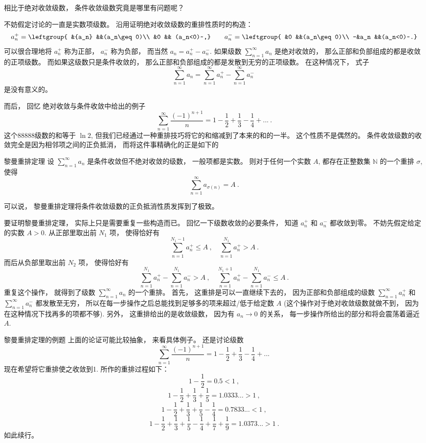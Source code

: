 

相比于绝对收敛级数， 条件收敛级数究竟是哪里有问题呢？ 

不妨假定讨论的一直是实数项级数。 沿用证明绝对收敛级数的重排性质时的构造： 
$$
a_n^+=\leftgroup{
&{a_n} &&(a_n\geq0)\\
&0 && (a_n<0)~,}
\qquad
a_n^-=\leftgroup{
&0 &&(a_n\geq0)\\
-&a_n &&(a_n<0)~.}
$$
可以很合理地将 $a_n^+$ 称为正部， $a_n^-$ 称为负部， 而当然 $a_n=a_n^+-a_n^-$. 如果级数 $\sum_{n=1}^\infty a_n$ 是绝对收敛的， 那么正部和负部组成的都是收敛的正项级数。 而如果这级数只是条件收敛的， 那么正部和负部组成的都是发散到无穷的正项级数。 在这种情况下， 式子
$$
\sum_{n=1}^\infty a_n=\sum_{n=1}^\infty a_n^+-\sum_{n=1}^\infty a_n^-~
$$
是没有意义的。

而后， 回忆 绝对收敛与条件收敛中给出的例子
$$
\sum_{n=1}^\infty\frac{(-1)^{n+1}}{n}
=1-\frac{1}{2}+\frac{1}{3}-\frac{1}{4}+...~.
$$
这个88888级数的和等于 $\ln2$, 但我们已经通过一种重排技巧将它的和缩减到了本来的和的一半。 这个性质不是偶然的。 条件收敛级数的收敛完全是因为相邻项之间的正负抵消， 而将这件事精确化的正是如下的

\begin{theorem}{黎曼重排定理}
设 $\sum_{n=1}^\infty a_n$ 是条件收敛但不绝对收敛的级数， 一般项都是实数。 则对于任何一个实数 $A$, 都存在正整数集 $\mathbb{N}$ 的一个重排 $\sigma$, 使得
$$
\sum_{n=1}^\infty a_{\sigma(n)}=A~.
$$
\end{theorem}

可以说， 黎曼重排定理将条件收敛级数的正负抵消性质发挥到了极致。

要证明黎曼重排定理， 实际上只是需要重复一些构造而已。 回忆一下级数收敛的必要条件， 知道 $a_n^+$ 和 $a_n^-$ 都收敛到零。 不妨先假定给定的实数 $A>0$. 从正部里取出前 $N_1$ 项， 使得恰好有
\[
\sum_{n=1}^{N_1-1}a_n^+\leq A~,
\quad
\sum_{n=1}^{N_1}a_n^+> A~.
\]
而后从负部里取出前 $N_2$ 项， 使得恰好有
\[
\sum_{n=1}^{N_1}a_n^+-\sum_{n=1}^{N_1}a_n^-> A~,
\quad
\sum_{n=1}^{N_1+1}a_n^+-\sum_{n=1}^{N_1}a_n^-\leq A~.
\]
重复这个操作， 就得到了级数 $\sum_{n=1}^\infty a_n$ 的一个重排。 首先， 这重排是可以一直继续下去的， 因为正部和负部组成的级数 $\sum_{n=1}^\infty a_n^+$ 和 $\sum_{n=1}^\infty a_n^-$ 都发散至无穷， 所以在每一步操作之后总能找到足够多的项来超过/低于给定数 $A$ (这个操作对于绝对收敛级数就做不到， 因为在这种情况下找再多的项都不够). 另外， 这重排给出的是收敛级数， 因为有 $a_n\to0$ 的关系， 每一步操作所给出的部分和将会震荡着逼近 $A$.

\begin{example}{黎曼重排定理的例题}
上面的论证可能比较抽象， 来看具体例子。 还是讨论级数
$$
\sum_{n=1}^\infty\frac{(-1)^{n+1}}{n}
=1-\frac{1}{2}+\frac{1}{3}-\frac{1}{4}+...~
$$
现在希望将它重排使之收敛到1. 所作的重排过程如下：
$$
1-\frac{1}{2}=0.5<1~,
$$ 
$$
1-\frac{1}{2}+\frac{1}{3}+\frac{1}{5}=1.0333...>1~,
$$ 
$$
1-\frac{1}{2}+\frac{1}{3}+\frac{1}{5}-\frac{1}{4}=0.7833...<1~,
$$ 
$$
1-\frac{1}{2}+\frac{1}{3}+\frac{1}{5}-\frac{1}{4}+\frac{1}{7}+\frac{1}{9}=1.0373...>1~.
$$
如此续行。
\end{example}
